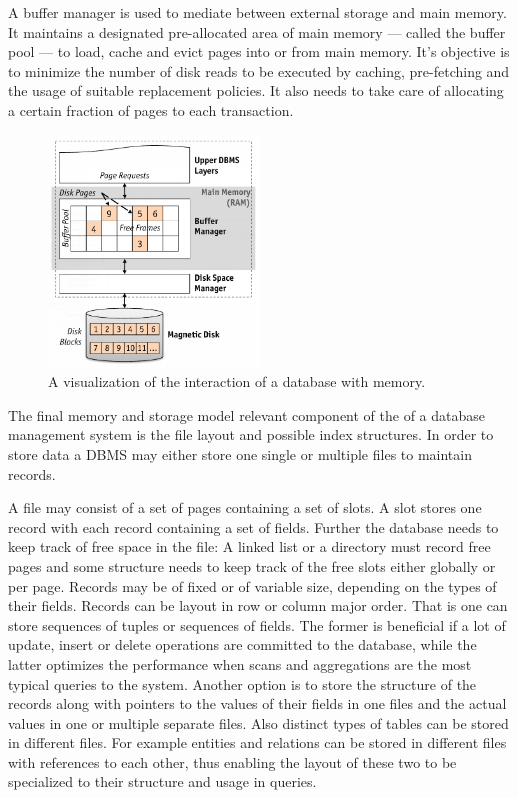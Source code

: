         A buffer manager is used to mediate between external storage and main memory. It maintains a designated pre-allocated area of main memory --- called the buffer pool --- to load, cache and evict pages into or from main memory.
        It's objective is to minimize the number of disk reads to be executed by caching, pre-fetching and the usage of suitable replacement policies. 
        It also needs to take care of allocating a certain fraction of pages to each transaction.

        \begin{figure}[htp]\label{dbms_memory}
            \begin{center}
            \includegraphics[keepaspectratio,height=0.4\textheight,width=0.5\textwidth]{img/00_intro/RDBMS_memory_view.png}
            \end{center}
            \caption{A visualization of the interaction of a database with memory.} %
        \end{figure}

        The final memory and storage model relevant component of the  of a database management system is the file layout and possible index structures. 
        In order to store data a DBMS may either store one single or multiple files to maintain records. 

        A file may consist of a set of pages containing a set of slots. A slot stores one record with each record containing a set of fields. Further the database needs to keep track of free space in the file: A linked list or a directory must record free pages and some structure needs to keep track of the free slots either globally or per page. 
        Records may be of fixed or of variable size, depending on the types of their fields. 
        Records can be layout in row or column major order.
        That is one can store sequences of tuples or sequences of fields.
        The former is beneficial if a lot of update, insert or delete operations are committed to the database, while the latter optimizes the performance when scans and aggregations are the most typical queries to the system.
        Another option is to store the structure of the records along with pointers to the values of their fields in one files and the actual values in one or multiple separate files. 
        Also distinct types of tables can be stored in different files. 
        For example entities and relations can be stored in different files with references to each other, thus enabling the layout of these two to be specialized to their structure and usage in queries.


